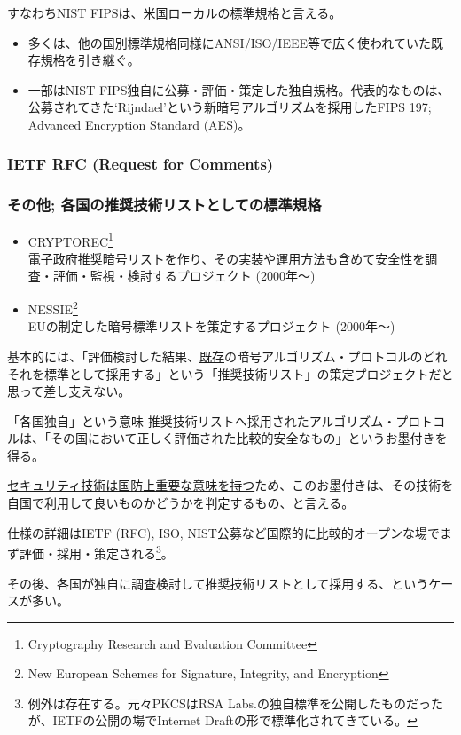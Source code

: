 \documentclass[12pt,dvipdfmx]{beamer}
\begin{document}
\begin{frame}
すなわちNIST FIPSは、米国ローカルの標準規格と言える。

\begin{itemize}
\item 多くは、他の国別標準規格同様にANSI/ISO/IEEE等で広く使われていた既存規格を引き継ぐ。
\item 一部はNIST FIPS独自に公募・評価・策定した独自規格。代表的なものは、公募されてきた`Rijndael'という新暗号アルゴリズムを採用したFIPS 197; Advanced Encryption Standard (AES)。
\end{itemize}
\end{frame}

\begin{frame}
\frametitle{IETF RFC (Request for Comments)}
\end{frame}

\begin{frame}
\frametitle{その他; 各国の推奨技術リストとしての標準規格}
\small
\begin{itemize}
 \item CRYPTOREC\footnote[frame]{\scriptsize Cryptography Research and Evaluation Committee} \\
電子政府推奨暗号リストを作り、その実装や運用方法も含めて安全性を調査・評価・監視・検討するプロジェクト (2000年〜)
 \item NESSIE\footnote[frame]{\scriptsize New European Schemes for Signature, Integrity, and Encryption}\\
EUの制定した暗号標準リストを策定するプロジェクト (2000年〜)
\end{itemize}
基本的には、「評価検討した結果、\underline{既存}の暗号アルゴリズム・プロトコルのどれそれを標準として採用する」という\alert{「推奨技術リスト」の策定プロジェクト}だと思って差し支えない。
\end{frame}

\begin{frame}
\small
 
\begin{block}{\small 「各国独自」という意味}
推奨技術リストへ採用されたアルゴリズム・プロトコルは、「その国において正しく評価された比較的安全なもの」というお墨付きを得る。


\underline{セキュリティ技術は国防上重要な意味を持つ}ため、このお墨付きは、その技術を自国で利用して良いものかどうかを判定するもの、と言える。
\end{block}

仕様の詳細はIETF (RFC), ISO, NIST公募など国際的に比較的オープンな場でまず評価・採用・策定される\footnote[frame]{\scriptsize 例外は存在する。元々PKCSはRSA Labs.の独自標準を公開したものだったが、IETFの公開の場でInternet Draftの形で標準化されてきている。}。

\vspace{1ex}

その後、各国が独自に調査検討して推奨技術リストとして採用する、というケースが多い。


\end{frame}
\end{document}

